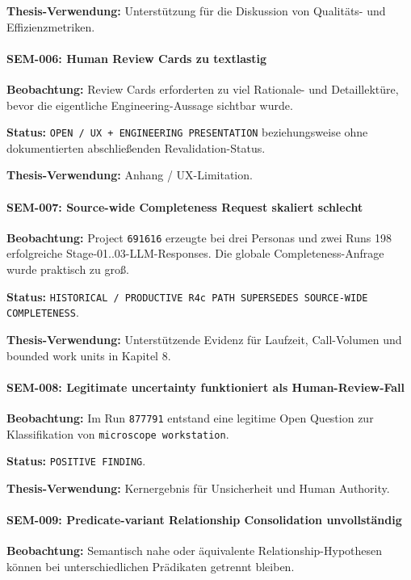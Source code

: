 \textbf{Thesis-Verwendung:}
Unterstützung für die Diskussion von Qualitäts- und Effizienzmetriken.


\paragraph{SEM-006: Human Review Cards zu textlastig}

\textbf{Beobachtung:}
Review Cards erforderten zu viel Rationale- und Detaillektüre, bevor die
eigentliche Engineering-Aussage sichtbar wurde.

\textbf{Status:}
\texttt{OPEN / UX + ENGINEERING PRESENTATION} beziehungsweise ohne dokumentierten
abschließenden Revalidation-Status.

\textbf{Thesis-Verwendung:}
Anhang / UX-Limitation.


\paragraph{SEM-007: Source-wide Completeness Request skaliert schlecht}

\textbf{Beobachtung:}
Project \texttt{691616} erzeugte bei drei Personas und zwei Runs 198 erfolgreiche
Stage-01..03-LLM-Responses. Die globale Completeness-Anfrage wurde praktisch zu groß.

\textbf{Status:}
\texttt{HISTORICAL / PRODUCTIVE R4c PATH SUPERSEDES SOURCE-WIDE COMPLETENESS}.

\textbf{Thesis-Verwendung:}
Unterstützende Evidenz für Laufzeit, Call-Volumen und bounded work units in
Kapitel 8.


\paragraph{SEM-008: Legitimate uncertainty funktioniert als Human-Review-Fall}

\textbf{Beobachtung:}
Im Run \texttt{877791} entstand eine legitime Open Question zur Klassifikation
von \texttt{microscope workstation}.

\textbf{Status:}
\texttt{POSITIVE FINDING}.

\textbf{Thesis-Verwendung:}
Kernergebnis für Unsicherheit und Human Authority.


\paragraph{SEM-009: Predicate-variant Relationship Consolidation unvollständig}

\textbf{Beobachtung:}
Semantisch nahe oder äquivalente Relationship-Hypothesen können bei
unterschiedlichen Prädikaten getrennt bleiben.

